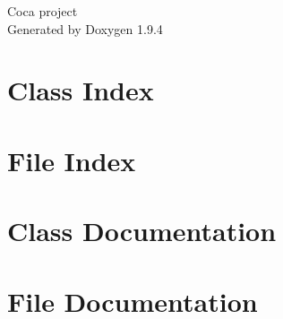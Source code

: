 \documentclass[twoside]{book}
\newcommand{\+}{\discretionary{\mbox{\scriptsize$\hookleftarrow$}}{}{}}
\newcommand{\clearemptydoublepage}{%
    \newpage{\pagestyle{empty}\cleardoublepage}%
  }
\begin{document}
  \raggedbottom
    \hypersetup{pageanchor=false,
                bookmarksnumbered=true,
                pdfencoding=unicode
               }
  \begin{titlepage}
  \vspace*{7cm}
  \begin{center}%
  {\Large Coca project}\\
  \vspace*{1cm}
  {\large Generated by Doxygen 1.9.4}\\
  \end{center}
  \end{titlepage}
  \clearemptydoublepage
  \tableofcontents
  \clearemptydoublepage
  \hypersetup{pageanchor=true}
\chapter{Class Index}

\chapter{File Index}

\chapter{Class Documentation}



\chapter{File Documentation}


















  \backmatter
  \newpage
  \clearemptydoublepage
  \printindex
\end{document}
